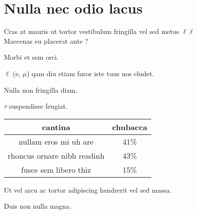 \section{Nulla nec odio lacus}

	\slideCentered
	{

		Cras at mauris ut tortor vestibulum fringilla vel sed metus $\ell \ell$\\
		Maecenas eu placerat ante ?
	}

	\slide
	{
		Morbi et sem orci.
        \itemList{}
		{
			\item $\ell$ (e, $\mu$) qam diu etiam furor iste tuus nos eludet.
			\item Nulla non fringilla diam.
			\item $\tau$ suspendisse feugiat.
		}
	}

	\slideCentered
	{
		\begin{tabular}{c|c}
			   cantina					& chubacca \\
			\hline
				    nullam eros mi uh are  	& 41\% \\
					rhoncus ornare nibh readinh  			& 43\% \\
				    fusce sem libero thiz & 15\% \\
		\end{tabular}

		\bigskip
        \itemList{}
		{
			\item Ut vel arcu ac tortor adipiscing hendrerit vel sed massa.
			\item Duis non nulla magna.
		}
	}
